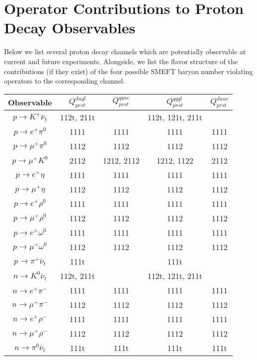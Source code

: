 \documentclass[aps,onecolumn,twoside,secnumarabic,balancelastpage,amsmath,amssymb,nofootinbib,hyperref=pdftex]{revtex4}
\begin{document}
\title{}
\author         {Noah Steinberg}
\date{\today}

\maketitle

\section{Operator Contributions to Proton Decay Observables}

Below we list several proton decay channels which are potentially observable at current and future experiments. Alongside, we list the flavor structure of the contributions (if they exist) of the four possible SMEFT baryon number violating operators to the corresponding channel.

\begin{center}
\begin{tabular}{ | | c | c | c | c | c | |}
\hline
Observable & $Q^{duql}_{prst}$ & $Q^{qque}_{prst}$ & $Q^{qqql}_{prst}$ & $Q^{duue}_{prst}$ \\
\hline\hline
$p\rightarrow K^{+}\bar{\nu}_{t}$ & 112t, 211t & & 112t, 121t, 211t & \\
\hline
$p\rightarrow e^{+}\pi^{0}$ & 1111 & 1111 & 1111 & 1111 \\
\hline
$p\rightarrow \mu^{+}\pi^{0}$ & 1112 & 1112 & 1112 & 1112 \\
\hline
$p\rightarrow \mu^{+}K^{0}$ & 2112 & 1212, 2112 & 1212, 1122 & 2112 \\
\hline
$p\rightarrow e^{+}\eta$ & 1111 & 1111 & 1111 & 1111 \\
\hline
$p\rightarrow \mu^{+}\eta$ & 1112 & 1112 & 1112 & 1112 \\
\hline
$p\rightarrow e^{+}\rho^{0}$  & 1111 & 1111 & 1111 & 1111 \\
\hline
$p\rightarrow \mu^{+}\rho^{0}$ & 1112 & 1112 & 1112 & 1112 \\
\hline
$p\rightarrow e^{+}\omega^{0}$  & 1111 & 1111 & 1111 & 1111 \\
\hline
$p\rightarrow \mu^{+}\omega^{0}$ & 1112 & 1112 & 1112 & 1112 \\
\hline
$p\rightarrow \pi^{+}\bar{\nu}_{t}$ & 111t & & 111t & \\
\hline
$n\rightarrow K^{0}\bar{\nu}_{t}$ & 112t, 211t & & 112t, 121t, 211t &\\ 
\hline
$n\rightarrow e^{+}\pi^{-}$ & 1111 & 1111 & 1111 & 1111 \\
\hline
$n\rightarrow \mu^{+}\pi^{-}$ & 1112 & 1112 & 1112 & 1112 \\
\hline
$n\rightarrow e^{+}\rho^{-}$ & 1111 & 1111 & 1111 & 1111 \\
\hline
$n\rightarrow \mu^{+}\rho^{-}$ & 1112 & 1112 & 1112 & 1112 \\
\hline
$n\rightarrow \pi^{0}\bar{\nu}_{t}$ & 111t & 111t & 111t & 111t \\
\hline
\end{tabular}
\end{center}
\end{document}
